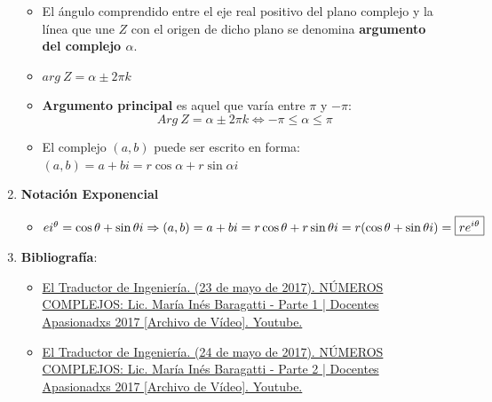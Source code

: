 \documentclass[12pt, twocolumn]{article}
\begin{document}
\begin{enumerate}
        \begin{itemize}
            \item El ángulo comprendido entre el eje real positivo del plano complejo y la línea que une $Z$ con el origen de dicho plano se denomina \textbf{argumento del complejo $\alpha$}.
            \item $arg \ Z=\alpha \pm 2\pi k$
            \item \textbf{Argumento principal} es aquel que varía entre $\pi$ y $-\pi$: $$Arg \ Z=\alpha \pm 2\pi k \Leftrightarrow -\pi\leq\alpha\leq\pi$$
            \item El complejo $(a,b)$ puede ser escrito en forma:
$(a,b)=a+bi=\boxed{r\cos{\alpha}+r\sin{\alpha}i}$
        \end{itemize}
    \item \textbf{Notación Exponencial}
        \begin{itemize}
            \item $ei^{\theta}=\cos{\theta}+\sin{\theta}i \Rightarrow\\
            (a,b)=a+bi =r\cos{\theta}+r\sin{\theta}i=
                        r(\cos{\theta}+\sin{\theta}i)=
                   \boxed{re^{i\theta}}$
        \end{itemize}
   \item \textbf{Bibliografía}:
\begin{itemize}
    \item \href{https://www.youtube.com/watch?v=5FemcGdN3Xw}{\small El Traductor de Ingeniería. (23 de mayo de 2017). NÚMEROS COMPLEJOS: Lic. María Inés Baragatti - Parte 1 | Docentes Apasionadxs 2017 [Archivo de Vídeo]. Youtube.}
    \item \href{https://www.youtube.com/watch?v=f7iOdIaourk}{\small El Traductor de Ingeniería. (24 de mayo de 2017). NÚMEROS COMPLEJOS: Lic. María Inés Baragatti - Parte 2 | Docentes Apasionadxs 2017 [Archivo de Vídeo]. Youtube.}
\end{itemize}
\end{enumerate}
\end{document}
